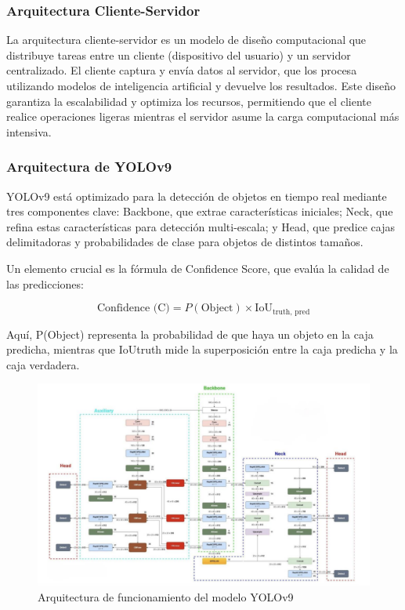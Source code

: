 \documentclass{article}
\begin{document}
\subsubsection{Arquitectura Cliente-Servidor}

La arquitectura cliente-servidor es un modelo de diseño computacional que distribuye tareas entre un cliente (dispositivo del usuario) y un servidor centralizado. El cliente captura y envía datos al servidor, que los procesa utilizando modelos de inteligencia artificial y devuelve los resultados. Este diseño garantiza la escalabilidad y optimiza los recursos, permitiendo que el cliente realice operaciones ligeras mientras el servidor asume la carga computacional más intensiva.

\subsubsection{Arquitectura de YOLOv9}

YOLOv9 está optimizado para la detección de objetos en tiempo real mediante tres componentes clave: Backbone, que extrae características iniciales; Neck, que refina estas características para detección multi-escala; y Head, que predice cajas delimitadoras y probabilidades de clase para objetos de distintos tamaños.

Un elemento crucial es la fórmula de Confidence Score, que evalúa la calidad de las predicciones:

\[
\text{Confidence (C)} = P(\text{Object}) \times \text{IoU}_{\text{truth, pred}}
\]

Aquí, P(Object) representa la probabilidad de que haya un objeto en la caja predicha, mientras que IoUtruth mide la superposición entre la caja predicha y la caja verdadera.

\begin{figure}[!hbtp]
    \centering
    \includegraphics[width=5in]{figuras/yolov9.png}
		\caption{Arquitectura de funcionamiento del modelo YOLOv9}
		\label{fig5}
\end{figure}
\end{document}
